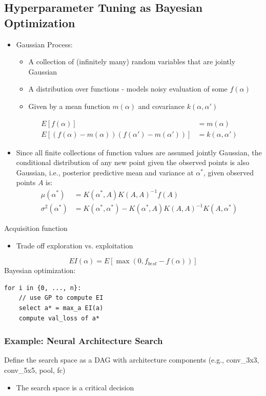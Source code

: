 \documentclass[10pt]{article}
\begin{document}
\subsection*{Hyperparameter Tuning as Bayesian Optimization}
\begin{itemize}
	\item Gaussian Process:
	\begin{itemize}
	    \item A collection of (infinitely many) random variables that are jointly Gaussian
	    \item A distribution over functions - models noisy evaluation of some $f(\alpha)$
	    \item Given by a mean function $m(\alpha)$ and covariance $k(\alpha, \alpha')$
    \end{itemize}
    \begin{align*}
        E[f(\alpha)] &= m(\alpha) \\
        E[(f(\alpha) - m(\alpha))(f(\alpha') - m(\alpha'))] &= k(\alpha, \alpha')
    \end{align*}
    \item Since all finite collections of function values are assumed jointly Gaussian, the conditional distribution of any new point given the observed points is also Gaussian, i.e., posterior predictive mean and variance at $\alpha^*$, given observed points $A$ is:
    \begin{align*}
        \mu(\alpha^*) &= K(\alpha^*, A) K(A, A)^{-1} f(A) \\
        \sigma^2(\alpha^*) &= K(\alpha^*, \alpha^*) - K(\alpha^*, A) K(A, A)^{-1} K(A, \alpha^*)
    \end{align*}
\end{itemize}
Acquisition function
\begin{itemize}
	\item Trade off exploration vs. exploitation
\end{itemize}
\[EI(\alpha) = E[\max(0, f_{best} - f(\alpha))]\]
Bayesian optimization:
\begin{verbatim}
for i in {0, ..., n}:
    // use GP to compute EI
    select a* = max_a EI(a)
    compute val_loss of a*
\end{verbatim}

\subsubsection*{Example: Neural Architecture Search}
Define the search space as a DAG with architecture components (e.g., conv\_3x3, conv\_5x5, pool, fc)
\begin{itemize}
	\item The search space is a critical decision
\end{itemize}
\end{document}
